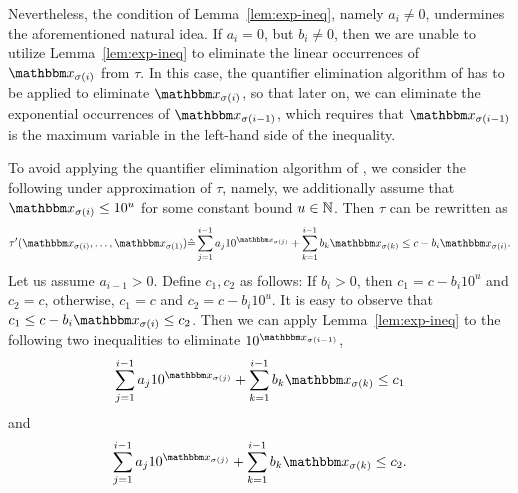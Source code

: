 Nevertheless, the condition of Lemma~\ref{lem:exp-ineq}, namely $a_i \neq 0$, undermines the aforementioned natural idea. If $a_i = 0$, but $b_i \neq 0$, 
then we are unable to utilize Lemma~\ref{lem:exp-ineq} to eliminate the linear occurrences of $\ivarx_{\sigma(i)}$ from $\tau$. In this case, the quantifier elimination algorithm of {\pa} has to be applied to eliminate $\ivarx_{\sigma(i)}$, so that later on, we can eliminate the exponential occurrences of $\ivarx_{\sigma(i-1)}$, which requires that $\ivarx_{\sigma(i-1)}$ is the maximum variable in the left-hand side of the inequality.

To avoid applying the quantifier elimination algorithm of {\pa}, we consider the following under approximation of $\tau$, namely, we additionally assume that $\ivarx_{\sigma(i)} \le 10^{u}$ for some constant bound $u \in \mathbb{N}$. Then $\tau$ can be rewritten as 
\[\tau'(\ivarx_{\sigma(i)}, \ldots, \ivarx_{\sigma(1)}) \Def \sum_{j=1}^{i-1} a_j 10^{\ivarx_{\sigma(j)}} + \sum_{k=1}^{i-1}b_k \ivarx_{\sigma(k)} \le c - b_i  \ivarx_{\sigma(i)}.\]
Let us assume $a_{i-1} > 0$.
Define $c_1, c_2$ as follows: If $b_i > 0$, then $c_1 = c- b_i 10^u$ and $c_2 = c$, otherwise, $c_1 = c$ and $c_2 = c - b_i 10^u$.
It is easy to observe that $c_1 \le c - b_i \ivarx_{\sigma(i)} \le c_2$.
Then we can apply Lemma~\ref{lem:exp-ineq} to the following two inequalities to eliminate $10^{\ivarx_{\sigma(i-1)}}$,
\begin{equation}\label{eqn-lb}
\sum_{j=1}^{i-1} a_j 10^{\ivarx_{\sigma(j)}} + \sum_{k=1}^{i-1}b_k \ivarx_{\sigma(k)} \le c_1
\end{equation}
and
\begin{equation}\label{eqn-ub}
\sum_{j=1}^{i-1} a_j 10^{\ivarx_{\sigma(j)}} + \sum_{k=1}^{i-1}b_k \ivarx_{\sigma(k)} \le c_2.
\end{equation}

